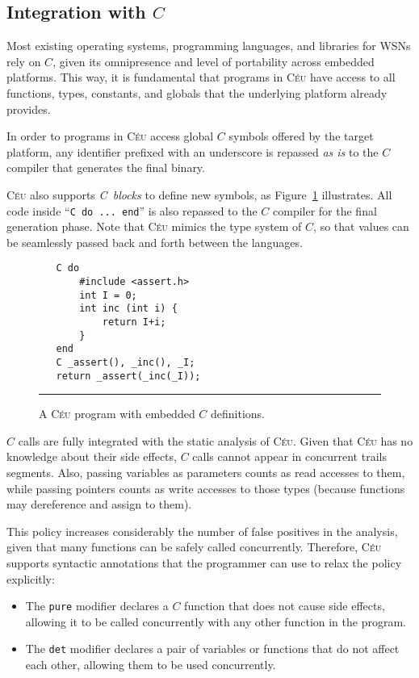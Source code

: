 \documentclass[10pt]{sensys-proc}
\newcommand{\CEU}{\textsc{C\'{e}u}\xspace}
\newcommand{\code}[1] {{\small{\texttt{#1}}}}
\begin{document}
\subsection{Integration with $C$}
\label{sec.ceu.c}

Most existing operating systems, programming languages, and libraries for WSNs 
rely on $C$, given its omnipresence and level of portability across embedded 
platforms.
This way, it is fundamental that programs in \CEU have access to all functions, 
types, constants, and globals that the underlying platform already provides.

In order to programs in \CEU access global $C$ symbols offered by the target 
platform, any identifier prefixed with an underscore is repassed \emph{as is} 
to the $C$ compiler that generates the final binary.

\CEU also supports \emph{C~blocks} to define new symbols, as Figure~\ref{lst.c} 
illustrates.
All code inside ``\code{C do ... end}'' is also repassed to the $C$ compiler 
for the final generation phase.
Note that \CEU{} mimics the type system of $C$, so that values can be 
seamlessly passed back and forth between the languages.

\begin{figure}[t]
{\small
\begin{verbatim}
   C do
       #include <assert.h>
       int I = 0;
       int inc (int i) {
           return I+i;
       }
   end
   C _assert(), _inc(), _I;
   return _assert(_inc(_I));
\end{verbatim}
}
\rule{8.5cm}{0.37pt}
\caption{ A \CEU program with embedded $C$ definitions.
\label{lst.c}
}
\end{figure}

$C$ calls are fully integrated with the static analysis of \CEU.
Given that \CEU has no knowledge about their side effects, $C$ calls cannot 
appear in concurrent trails segments.
Also, passing variables as parameters counts as read accesses to them, while 
passing pointers counts as write accesses to those types (because functions may 
dereference and assign to them).

This policy increases considerably the number of false positives in the 
analysis, given that many functions can be safely called concurrently.
Therefore, \CEU supports syntactic annotations that the programmer can use to 
relax the policy explicitly:

\begin{itemize}
\item The \code{pure} modifier declares a $C$ function that does not cause side 
      effects, allowing it to be called concurrently with any other function in 
the program.
\item The \code{det} modifier declares a pair of variables or functions that do 
      not affect each other, allowing them to be used concurrently.
\end{itemize}
\end{document}
